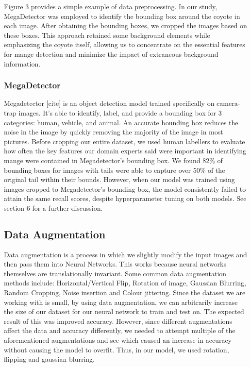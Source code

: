 \documentclass{article}
\begin{document}
Figure 3 provides a simple example of data preprocessing. In our study, MegaDetector was employed to identify the bounding box around the coyote in each image. After obtaining the bounding boxes, we cropped the images based on these boxes. This approach retained some background elements while emphasizing the coyote itself, allowing us to concentrate on the essential features for mange detection and minimize the impact of extraneous background information.


\subsubsection{MegaDetector}
Megadetector [cite] is an object detection model trained specifically on camera-trap images. It’s able to identify, label, and provide a bounding box for 3 categories: human, vehicle, and animal. An accurate bounding box reduces the noise in the image by quickly removing the majority of the image in most pictures. Before cropping our entire dataset, we used human labellers to evaluate how often the key features our domain experts said were important in identifying mange were contained in Megadetector’s bounding box. We found 82\% of bounding boxes for images with tails were able to capture over 50\% of the original tail within their bounds. However, when our model was trained using images cropped to Megadetector’s bounding box, the model consistently failed to attain the same recall scores, despite hyperparameter tuning on both models. See section 6 for a further discussion.
\subsection{Data Augmentation}
Data augmentation is a process in which we slightly modify the input images and then pass them into Neural Networks. This works because neural networks themselves are translationally invariant. Some common data augmentation methods include: Horizontal/Vertical Flip, Rotation of image, Gaussian Blurring, Random Cropping, Noise insertion and Colour jittering. Since the dataset we are working with is small, by using data augmentation, we can arbitrarily increase the size of our dataset for our neural network to train and test on. The expected result of this was improved accuracy. However, since different augmentations affect the data and accuracy differently, we needed to attempt multiple of the aforementioned augmentations and see which caused an increase in accuracy without causing the model to overfit. Thus, in our model, we used rotation, flipping and gaussian blurring.
\end{document}

